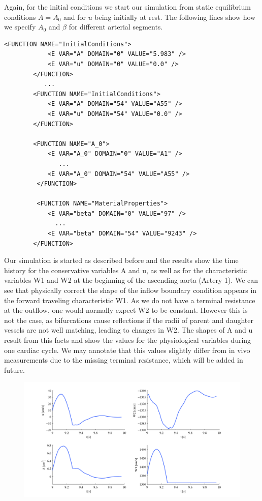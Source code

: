 Again, for the initial conditions we start our simulation from static
equilibrium conditions $A = A_0$ and for $u$ being initially at rest. The
following lines show how we specify $A_0$ and $\beta$ for different arterial
segments.
\begin{lstlisting}[style=XmlStyle]
        <FUNCTION NAME="InitialConditions">
            <E VAR="A" DOMAIN="0" VALUE="5.983" />
            <E VAR="u" DOMAIN="0" VALUE="0.0" />
        </FUNCTION>
           ...
        <FUNCTION NAME="InitialConditions">
            <E VAR="A" DOMAIN="54" VALUE="A55" />
            <E VAR="u" DOMAIN="54" VALUE="0.0" />
        </FUNCTION>

        <FUNCTION NAME="A_0">
            <E VAR="A_0" DOMAIN="0" VALUE="A1" />
               ...
            <E VAR="A_0" DOMAIN="54" VALUE="A55" />
         </FUNCTION>

         <FUNCTION NAME="MaterialProperties"> 
            <E VAR="beta" DOMAIN="0" VALUE="97" />
              ...
            <E VAR="beta" DOMAIN="54" VALUE="9243" />
        </FUNCTION>
\end{lstlisting}

Our simulation is started as described before and the results show the time
history for the conservative variables A and u, as well as for the
characteristic variables W1 and W2 at the beginning of the ascending aorta
(Artery 1). We can see that physically correct the shape of the inflow boundary
condition appears in the forward traveling characteristic W1. As we do not have
a terminal resistance at the outflow, one would normally expect W2 to be
constant. However this is not the case, as bifurcations cause reflections if the
radii of parent and daughter vessels are not well matching, leading to changes
in W2. The shapes of A and u result from this facts and show the values for the
physiological variables during one cardiac cycle. We may annotate that this
values slightly differ from in vivo measurements due to the missing terminal
resistance, which will be added in future.

\begin{figure}
	\includegraphics[width=\linewidth]{Figures/Network_Results.png}
\end{figure}

